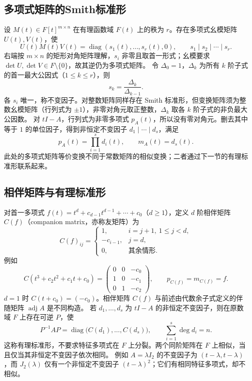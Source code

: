 \documentclass[../main.tex]{subfiles}
\begin{document}
\subsection{多项式矩阵的Smith标准形}
设 $M(t)\in F[t]^{m\times n}$ 在有理函数域 $F(t)$ 上的秩为 $r$。存在多项式幺模矩阵 $U(t),V(t)$，使
\[
U(t)M(t)V(t)=\operatorname{diag}(s_1(t),\ldots,s_r(t),0),\qquad
s_1\mid s_2\mid\cdots\mid s_r.
\]
右端按 $m\times n$ 的矩形对角矩阵理解，$s_i$ 非零且取首一形式；幺模要求 $\det U,\det V\in F\setminus\{0\}$，故其逆仍为多项式矩阵。
令 $\Delta_0=1$，$\Delta_k$ 为所有 $k$ 阶子式的首一最大公因式（$1\le k\le r$），则
\[
s_k=\frac{\Delta_k}{\Delta_{k-1}}.
\]
各 $s_i$ 唯一，称不变因子。对整数矩阵同样存在 Smith 标准形，但变换矩阵须为整数幺模矩阵（行列式为 $\pm1$），非零对角元取正整数，$\Delta_k$ 取各 $k$ 阶子式的非负最大公因数。
对 $tI-A$，行列式为非零多项式 $p_A(t)$，所以没有零对角元。删去其中等于 $1$ 的单位因子，得到非恒定不变因子 $d_1\mid\cdots\mid d_s$，满足
\[
p_A(t)=\prod_{i=1}^s d_i(t),\qquad m_A(t)=d_s(t).
\]
此处的多项式矩阵等价变换不同于常数矩阵的相似变换；二者通过下一节的有理标准形联系起来。
\subsection{相伴矩阵与有理标准形}
对首一多项式 $f(t)=t^d+c_{d-1}t^{d-1}+\cdots+c_0$（$d\ge1$），定义 $d$ 阶相伴矩阵 $C(f)$（companion matrix，亦称友矩阵）为
\[
C(f)_{ij}=\begin{cases}
1,&i=j+1,\ 1\le j<d,\\
-c_{i-1},&j=d,\\
0,&\text{其余情形}.
\end{cases}
\]
例如
\[
C(t^3+c_2t^2+c_1t+c_0)=
\begin{pmatrix}0&0&-c_0\\1&0&-c_1\\0&1&-c_2\end{pmatrix},\qquad
p_{C(f)}=m_{C(f)}=f.
\]
$d=1$ 时 $C(t+c_0)=(-c_0)$。相伴矩阵 $C(f)$ 与前述由代数余子式定义的伴随矩阵 $\operatorname{adj}A$ 是不同构造。
若 $d_1,\ldots,d_s$ 为 $tI-A$ 的非恒定不变因子，则在原数域 $F$ 上存在可逆 $P$，使
\[
P^{-1}AP=\operatorname{diag}\bigl(C(d_1),\ldots,C(d_s)\bigr),\qquad
\sum_{i=1}^s\deg d_i=n.
\]
这称有理标准形，不要求特征多项式在 $F$ 上分裂。两个同阶矩阵在 $F$ 上相似，当且仅当其非恒定不变因子依次相同。
例如 $A=\lambda I_2$ 的不变因子为 $(t-\lambda,t-\lambda)$，而 $J_2(\lambda)$ 仅有一个非恒定不变因子 $(t-\lambda)^2$；它们有相同特征多项式，却不相似。
\end{document}
